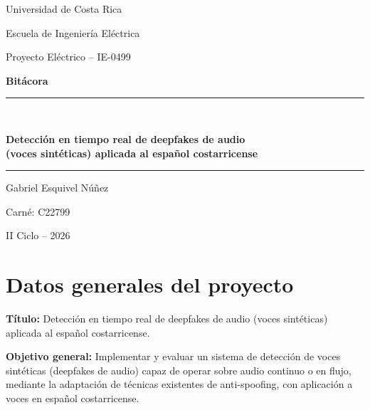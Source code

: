 \documentclass[11pt]{article}
\newcommand{\campo}[1]{\textbf{#1}}
\begin{document}
\begin{titlepage}
\centering
\vspace*{1.5cm}
{\large Universidad de Costa Rica\par}
{\large Escuela de Ingeniería Eléctrica\par}
\vspace{1cm}
{\Large Proyecto Eléctrico -- IE-0499\par}
\vspace{2cm}
{\huge \bfseries Bitácora\par}
\vspace{1cm}
\rule{0.7\textwidth}{0.4pt}\\[0.4cm]
{\Large\bfseries Detección en tiempo real de deepfakes de audio\\ (voces sintéticas) aplicada al español costarricense\par}
\rule{0.7\textwidth}{0.4pt}
\vspace{3cm}

{\large Gabriel Esquivel Núñez\par}
{\large Carné: C22799\par}

\vfill

{\large II Ciclo -- 2026\par}
\vspace{0.5cm}
\end{titlepage}

\section*{Datos generales del proyecto}

\campo{Título:} Detección en tiempo real de deepfakes de audio (voces sintéticas) aplicada al español costarricense.

\vspace{0.3cm}
\campo{Objetivo general:} Implementar y evaluar un sistema de detección de voces sintéticas (deepfakes de audio) capaz de operar sobre audio continuo o en flujo, mediante la adaptación de técnicas existentes de anti-spoofing, con aplicación a voces en español costarricense.
\end{document}
